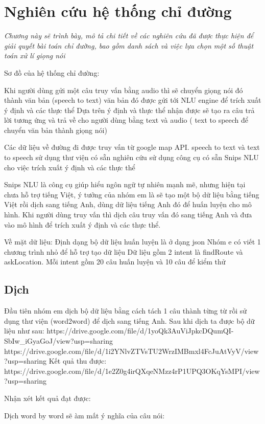 \chapter{Nghiên cứu hệ thống chỉ đường}
\label{Chapter3}

\emph{Chương này sẽ trình bày, mô tả chi tiết về các nghiên cứu đã được thực hiện để giải quyết bài toán chỉ đường, bao gồm danh sách và việc lựa chọn một số thuật toán xử lí giọng nói
}

Sơ đồ của hệ thống chỉ đường: 


Khi người dùng gửi một câu truy vấn bằng audio thì sẽ chuyển giọng nói đó thành văn bản (speech to text) 
văn bản đó được gửi tới NLU engine để trích xuất ý định và các thực thể 
Dựa trên ý định và thực thể nhận được sẽ tạo ra câu trả lời tương ứng và trả về cho người dùng bằng text và audio ( text to speech để chuyển văn bản thành giọng nói) 

Các dữ liệu về đường đi được truy vấn từ google map API. 
speech to text và text to speech sử dụng thư viện có sẵn
nghiên cứu sử dụng công cụ có sẵn Snips NLU cho việc trích xuất ý định và các thực thể 

Snips NLU là công cụ giúp hiểu ngôn ngữ tự nhiên mạnh mẽ, nhưng hiện tại chưa hỗ trợ tiếng Việt, ý tưởng của nhóm em là sẽ tạo một bộ dữ liệu bằng tiếng Việt rồi dịch sang tiếng Anh, dùng dữ liệu tiếng Anh đó để huấn luyện cho mô hình. Khi người dùng truy vấn thì dịch câu truy vấn đó sang tiếng Anh và đưa vào mô hình để trích xuất ý định và các thực thể. 

Về mặt dữ liệu:
Định dạng bộ dữ liệu huấn luyện là ở dạng json 
Nhóm e có viết 1 chương trình nhỏ để hỗ trợ tạo dữ liệu
Dữ liệu gồm 2 intent là findRoute và askLocation. Mỗi intent gồm 20 câu huấn luyện và 10 câu để kiểm thử 
\section{Dịch}
Đầu tiên nhóm em dịch bộ dữ liệu bằng cách tách 1 câu thành từng từ rồi sử dụng thư viện (word2word) để dịch sang tiếng Anh.
Sau khi dịch ta được bộ dữ liệu như sau:
https://drive.google.com/file/d/1yoQk3AuViJpkcDQumQI-SbIw_iGyaGoJ/view?usp=sharing
https://drive.google.com/file/d/1i2YNlvZTVsTU2WrzIMBmxl4FcJuAtVyV/view?usp=sharing
Kết quả thu được: 
https://drive.google.com/file/d/1e2Z0g4irQXqeNMzz4rP1UPQ3OKqYsMPI/view?usp=sharing

Nhận xét kết quả đạt được: 

Dịch word by word sẽ àm mất ý nghĩa của câu nói: 

